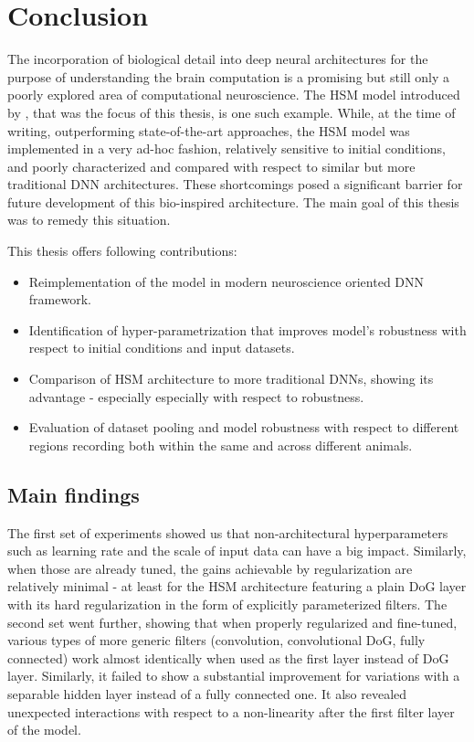 \chapter*{Conclusion}\label{ch:6}
The incorporation of biological detail into deep neural architectures for the purpose of understanding the brain computation is a promising but still only a poorly explored area of computational neuroscience. The {HSM model} introduced by \cite{antolik}, that was the focus of this thesis, is one such example. While, at the time of writing, outperforming state-of-the-art approaches, the {HSM model} was implemented in a very ad-hoc fashion, relatively sensitive to initial conditions, and poorly characterized and compared with respect to similar but more traditional DNN architectures. These shortcomings posed a significant barrier for future development of this bio-inspired architecture. The main goal of this thesis was to remedy this situation. 

This thesis offers following contributions:

\begin{itemize}
    \item Reimplementation of the model in modern neuroscience oriented DNN\\ framework.
    \item Identification of hyper-parametrization that improves model’s robustness with respect to initial conditions and input datasets.
    \item Comparison of {HSM architecture} to more traditional DNNs, showing its advantage - especially especially with respect to robustness.
    \item Evaluation of dataset pooling and model robustness with respect to different regions recording both within the same and across different animals.
\end{itemize}

\section*{Main findings}

The first set of experiments showed us that non-architectural hyperparameters such as learning rate and the scale of input data can have a big impact. Similarly, when those are already tuned, the gains achievable by regularization are relatively minimal - at least for the {HSM architecture} featuring a plain DoG layer with its hard regularization in the form of explicitly parameterized filters. The second set went further, showing that when properly regularized and fine-tuned, various types of more generic filters (convolution, convolutional DoG, fully connected) work almost identically when used as the first layer instead of DoG layer. Similarly, it failed to show a substantial improvement for variations with a separable hidden layer instead of a fully connected one. It also revealed unexpected interactions with respect to a non-linearity after the first filter layer of the model. 

